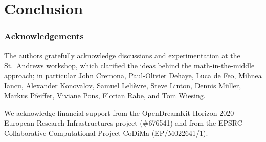 \documentclass{llncs}
\begin{document}








\section{Conclusion}
\subsubsection*{Acknowledgements}
The authors gratefully acknowledge discussions and experimentation at the St.\ Andrews
workshop, which clarified the ideas behind the math-in-the-middle approach;
in particular John Cremona, Paul-Olivier Dehaye, Luca de Feo, Mihnea Iancu, Alexander
Konovalov, Samuel Leli\`evre, Steve Linton, Dennis M\"uller, Markus Pfeiffer, Viviane Pons,
Florian Rabe, and Tom Wiesing.

We acknowledge financial support from the OpenDreamKit Horizon 2020 European Research
Infrastructures project (\#676541) and from the EPSRC Collaborative Computational Project
CoDiMa (EP/M022641/1).

\printbibliography
\end{document}
